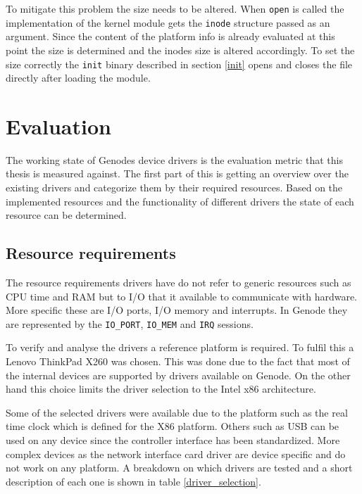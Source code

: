 \documentclass[
a4paper,
12pt,
notitlepage,
parskip=half,
DIV=11,
]{scrbook}
\begin{document}
		To mitigate this problem the size needs to be altered.
		When \texttt{open} is called the implementation of the kernel module gets the \texttt{inode} structure passed as an argument.
		Since the content of the platform info is already evaluated at this point the size is determined and the inodes size is altered accordingly.
		To set the size correctly the \texttt{init} binary described in section \ref{init} opens and closes the file directly after loading the module.
	
	\chapter{Evaluation}
	
		The working state of Genodes device drivers is the evaluation metric that this thesis is measured against.
		The first part of this is getting an overview over the existing drivers and categorize them by their required resources.
		Based on the implemented resources and the functionality of different drivers the state of each resource can be determined.
		
		\section{Resource requirements}
		
		The resource requirements drivers have do not refer to generic resources such as CPU time and RAM but to I/O that it available to communicate with hardware.
		More specific these are I/O ports, I/O memory and interrupts.
		In Genode they are represented by the \texttt{IO\_PORT}, \texttt{IO\_MEM} and \texttt{IRQ} sessions.
		
		To verify and analyse the drivers a reference platform is required.
		To fulfil this a Lenovo ThinkPad X260 was chosen.
		This was done due to the fact that most of the internal devices are supported by drivers available on Genode.
		On the other hand this choice limits the driver selection to the Intel x86 architecture.
		
		Some of the selected drivers were available due to the platform such as the real time clock which is defined for the X86 platform.
		Others such as USB can be used on any device since the controller interface has been standardized.
		More complex devices as the network interface card driver are device specific and do not work on any platform.
		A breakdown on which drivers are tested and a short description of each one is shown in table \ref{driver_selection}.
		
\end{document}
